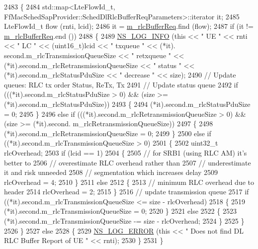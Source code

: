 \begin{DoxyCode}
2483 \{
2484   std::map<LteFlowId\_t, FfMacSchedSapProvider::SchedDlRlcBufferReqParameters>::iterator it;
2485   LteFlowId\_t flow (rnti, lcid);
2486   it = \hyperlink{classns3_1_1PssFfMacScheduler_af66c823e9ee8ce17084dff35ce128191}{m\_rlcBufferReq}.find (flow);
2487   \textcolor{keywordflow}{if} (it != \hyperlink{classns3_1_1PssFfMacScheduler_af66c823e9ee8ce17084dff35ce128191}{m\_rlcBufferReq}.end ())
2488     \{
2489       \hyperlink{group__logging_gafbd73ee2cf9f26b319f49086d8e860fb}{NS\_LOG\_INFO} (\textcolor{keyword}{this} << \textcolor{stringliteral}{" UE "} << rnti << \textcolor{stringliteral}{" LC "} << (uint16\_t)lcid << \textcolor{stringliteral}{" txqueue "} << (*it).
      second.m\_rlcTransmissionQueueSize << \textcolor{stringliteral}{" retxqueue "} << (*it).second.m\_rlcRetransmissionQueueSize << \textcolor{stringliteral}{" status "} 
      << (*it).second.m\_rlcStatusPduSize << \textcolor{stringliteral}{" decrease "} << size);
2490       \textcolor{comment}{// Update queues: RLC tx order Status, ReTx, Tx}
2491       \textcolor{comment}{// Update status queue}
2492       \textcolor{keywordflow}{if} (((*it).second.m\_rlcStatusPduSize > 0) && (size >= (*it).second.m\_rlcStatusPduSize))
2493         \{
2494            (*it).second.m\_rlcStatusPduSize = 0;
2495         \}
2496       \textcolor{keywordflow}{else} \textcolor{keywordflow}{if} (((*it).second.m\_rlcRetransmissionQueueSize > 0) && (size >= (*it).second.
      m\_rlcRetransmissionQueueSize))
2497         \{
2498           (*it).second.m\_rlcRetransmissionQueueSize = 0;
2499         \}
2500       \textcolor{keywordflow}{else} \textcolor{keywordflow}{if} ((*it).second.m\_rlcTransmissionQueueSize > 0)
2501         \{
2502           uint32\_t rlcOverhead;
2503           \textcolor{keywordflow}{if} (lcid == 1)
2504             \{
2505               \textcolor{comment}{// for SRB1 (using RLC AM) it's better to}
2506               \textcolor{comment}{// overestimate RLC overhead rather than}
2507               \textcolor{comment}{// underestimate it and risk unneeded}
2508               \textcolor{comment}{// segmentation which increases delay }
2509               rlcOverhead = 4;                                  
2510             \}
2511           \textcolor{keywordflow}{else}
2512             \{
2513               \textcolor{comment}{// minimum RLC overhead due to header}
2514               rlcOverhead = 2;
2515             \}
2516           \textcolor{comment}{// update transmission queue}
2517           \textcolor{keywordflow}{if} ((*it).second.m\_rlcTransmissionQueueSize <= size - rlcOverhead)
2518             \{
2519               (*it).second.m\_rlcTransmissionQueueSize = 0;
2520             \}
2521           \textcolor{keywordflow}{else}
2522             \{                    
2523               (*it).second.m\_rlcTransmissionQueueSize -= size - rlcOverhead;
2524             \}
2525         \}
2526     \}
2527   \textcolor{keywordflow}{else}
2528     \{
2529       \hyperlink{group__logging_ga0261a8db1d4ac5f79417d117634fd455}{NS\_LOG\_ERROR} (\textcolor{keyword}{this} << \textcolor{stringliteral}{" Does not find DL RLC Buffer Report of UE "} << rnti);
2530     \}
2531 \}
\end{DoxyCode}


